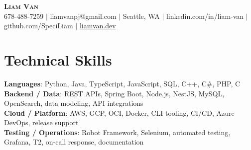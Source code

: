 \documentclass[letterpaper,11pt]{article}
\begin{document}

%
\begin{center}
    \textbf{\Huge \scshape Liam Van} \\ \vspace{1pt}
    \small 678-488-7259 $|$ \small {liamvanpj@gmail.com} $|$ Seattle, WA
 {{$|$ linkedin.com/in/liam-van} {$|$ github.com/SpeciLiam} {$|$ \href{https://liamvan.dev}{liamvan.dev}}}

\end{center}

\section{Technical Skills}
 \begin{itemize}[leftmargin=0.15in, label={}]
    \small{\item{
     \textbf{Languages}{: Python, Java, TypeScript, JavaScript, SQL, C++, C\#, PHP, C} \\
     \textbf{Backend / Data}{: REST APIs, Spring Boot, Node.js, NestJS, MySQL, OpenSearch, data modeling, API integrations} \\
     \textbf{Cloud / Platform}{: AWS, GCP, OCI, Docker, CLI tooling, CI/CD, Azure DevOps, release support} \\
     \textbf{Testing / Operations}{: Robot Framework, Selenium, automated testing, Grafana, T2, on-call response, documentation} \\
    }}
 \end{itemize}
%

\end{document}

